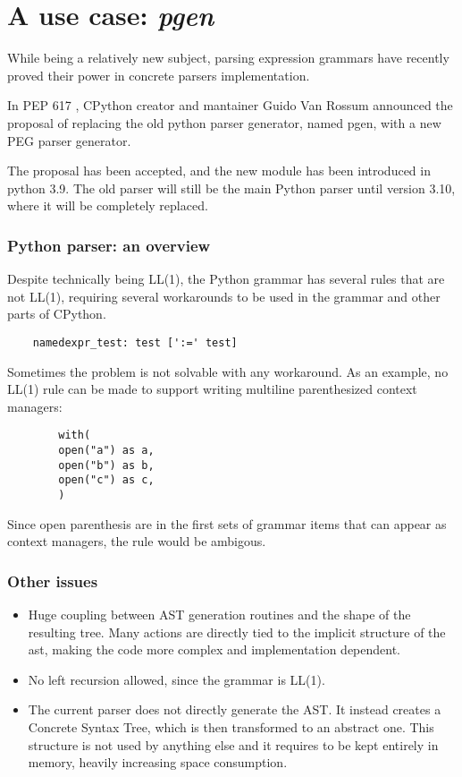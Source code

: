 \section{A use case: \emph{pgen}}
\begin{frame}
    While being a relatively new subject, parsing expression grammars have recently proved their  power in concrete parsers implementation.
    
    \begin{block}{}
    	In PEP 617 \cite{python}, CPython creator and mantainer Guido Van Rossum announced the proposal of replacing the old python parser generator, named pgen, with a new PEG parser generator.
    \end{block}
	\begin{block}{}
		The proposal has been accepted, and the new module has been introduced in python 3.9. The old parser will still be the main Python parser until version 3.10, where it will be completely replaced.
	\end{block}
\end{frame}

\begin{frame}[fragile]
	\small
	\frametitle{Python parser: an overview}
	Despite technically being LL(1), the Python grammar has several rules that are not LL(1), requiring several workarounds to be used in the grammar and other parts of CPython.  
		\begin{verbatim}
  	namedexpr_test: test [':=' test]
		\end{verbatim}
		Sometimes the problem is not solvable with any workaround. As an example, no LL(1) rule can be made to support writing multiline parenthesized context managers:
		\begin{verbatim}
		with(
		open("a") as a,
		open("b") as b,
		open("c") as c,
		)
		\end{verbatim}

Since open parenthesis are in the first sets of grammar items that can appear as context managers, the rule would be ambigous.
\end{frame}

\begin{frame}
	\frametitle{Other issues}
	\begin{itemize}
		\item Huge coupling between AST generation routines and the shape of the resulting tree. Many actions are directly tied to the implicit structure of the ast, making the code more complex and implementation dependent.
		\item No left recursion allowed, since the grammar is LL(1).
		
		\item The current parser does not directly generate the AST. It instead creates a Concrete Syntax Tree, which is then  transformed to an abstract one. This structure is not used by anything else and it requires to be kept entirely in memory, heavily  increasing space consumption.
	\end{itemize}
\end{frame}

